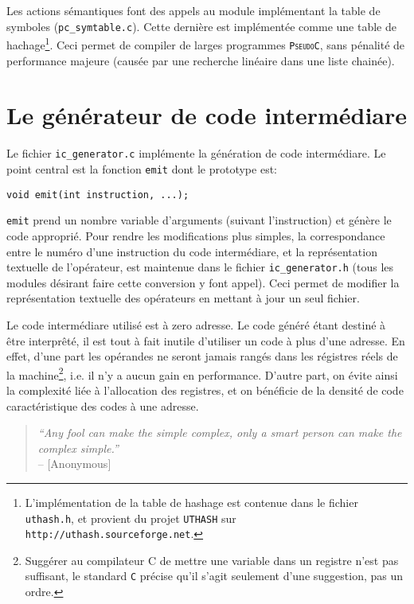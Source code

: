 \documentclass[12pt,a4paper,openright]{report}
\newcommand{\nom}[1]{\textsc{\texttt{#1}}}
\newcommand{\pc}{\nom{PseudoC}}
\newcommand{\ce}{\nom{C}}
\begin{document}
    Les actions sémantiques font des appels au module implémentant la
    table de symboles (\texttt{pc\_symtable.c}). Cette dernière est
    implémentée comme une table de hachage\footnote{L'implémentation de
    la table de hashage est contenue dans le fichier \texttt{uthash.h},
    et provient du projet \nom{UTHASH} sur
    \texttt{http://uthash.sourceforge.net}.}. Ceci permet de compiler de
    larges programmes \pc, sans pénalité de performance majeure (causée
    par une recherche linéaire dans une liste chainée).
    
\chapter{Le générateur de code intermédiare}
    Le fichier \texttt{ic\_generator.c} implémente la génération de code
    intermédiare. Le point central est la fonction \texttt{emit} dont le
    prototype est:

    \texttt{void emit(int instruction, ...);}

    \texttt{emit} prend un nombre variable d'arguments (suivant
    l'instruction) et génère le code approprié. Pour rendre les
    modifications plus simples, la correspondance entre le numéro d'une
    instruction du code intermédiare, et la représentation textuelle de
    l'opérateur, est maintenue dans le fichier \texttt{ic\_generator.h}
    (tous les modules désirant faire cette conversion y font appel).
    Ceci permet de modifier la représentation textuelle des opérateurs
    en mettant à jour un seul fichier.

    Le code intermédiare utilisé est à zero adresse. Le code généré
    étant destiné à être interprêté, il est tout à fait inutile
    d'utiliser un code à plus d'une adresse. En effet, d'une part les
    opérandes ne seront jamais rangés dans les régistres réels de la
    machine\footnote{Suggérer au compilateur C de mettre une variable
    dans un registre n'est pas suffisant, le standard \ce{} précise qu'il
    s'agit seulement d'une suggestion, pas un ordre.}, i.e. il n'y a
    aucun gain en performance. D'autre part, on évite ainsi la
    complexité liée à l'allocation des registres, et on bénéficie de la
    densité de code caractéristique des codes à une adresse.

\begin{quote}
\emph{``Any fool can make the simple complex, only a smart person can make the
complex simple.''} \\
-- [Anonymous]
\end{quote}
\end{document}
